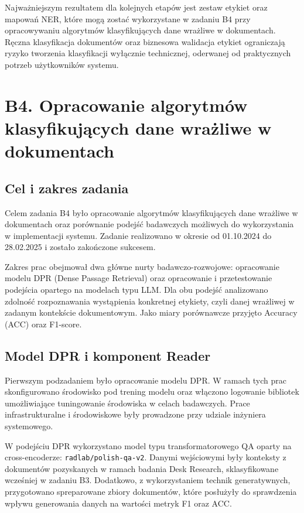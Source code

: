 \documentclass[12pt,a4paper]{report}
\begin{document}
Najważniejszym rezultatem dla kolejnych etapów jest zestaw etykiet oraz mapowań NER, które mogą zostać wykorzystane w zadaniu B4 przy opracowywaniu algorytmów klasyfikujących dane wrażliwe w dokumentach. Ręczna klasyfikacja dokumentów oraz biznesowa walidacja etykiet ograniczają ryzyko tworzenia klasyfikacji wyłącznie technicznej, oderwanej od praktycznych potrzeb użytkowników systemu.



\section{B4. Opracowanie algorytmów klasyfikujących dane wrażliwe w dokumentach}
\subsection{Cel i zakres zadania}
Celem zadania B4 było opracowanie algorytmów klasyfikujących dane wrażliwe w dokumentach oraz porównanie podejść badawczych możliwych do wykorzystania w implementacji systemu. Zadanie realizowano w okresie od 01.10.2024 do 28.02.2025 i zostało zakończone sukcesem.

Zakres prac obejmował dwa główne nurty badawczo-rozwojowe: opracowanie modelu DPR (Dense Passage Retrieval) oraz opracowanie i przetestowanie podejścia opartego na modelach typu LLM. Dla obu podejść analizowano zdolność rozpoznawania wystąpienia konkretnej etykiety, czyli danej wrażliwej w zadanym kontekście dokumentowym. Jako miary porównawcze przyjęto Accuracy (ACC) oraz F1-score.

\subsection{Model DPR i komponent Reader}
Pierwszym podzadaniem było opracowanie modelu DPR. W ramach tych prac skonfigurowano środowisko pod trening modelu oraz włączono logowanie bibliotek umożliwiające tuningowanie środowiska w celach badawczych. Prace infrastrukturalne i środowiskowe były prowadzone przy udziale inżyniera systemowego.

W podejściu DPR wykorzystano model typu transformatorowego QA oparty na cross-encoderze: \texttt{radlab/polish-qa-v2}. Danymi wejściowymi były konteksty z dokumentów pozyskanych w ramach badania Desk Research, sklasyfikowane wcześniej w zadaniu B3. Dodatkowo, z wykorzystaniem technik generatywnych, przygotowano spreparowane zbiory dokumentów, które posłużyły do sprawdzenia wpływu generowania danych na wartości metryk F1 oraz ACC.
\end{document}
